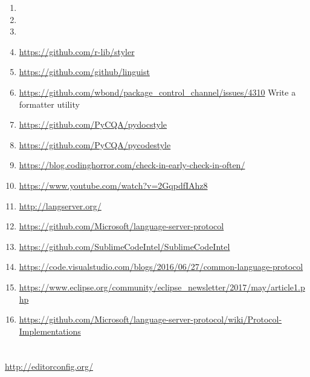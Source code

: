 {\begin{enumerate}
    \item {}
    \item {}
    \item {}
    \item \url{https://github.com/r-lib/styler}
    \item \url{https://github.com/github/linguist}
    \item \url{https://github.com/wbond/package_control_channel/issues/4310} Write a formatter utility
    \item \url{https://github.com/PyCQA/pydocstyle}
    \item \url{https://github.com/PyCQA/pycodestyle}
    \item \url{https://blog.codinghorror.com/check-in-early-check-in-often/}
    \item \url{https://www.youtube.com/watch?v=2GqpdfIAhz8}
    \item \url{http://langserver.org/}
    \item \url{https://github.com/Microsoft/language-server-protocol}
    \item \url{https://github.com/SublimeCodeIntel/SublimeCodeIntel}
    \item \url{https://code.visualstudio.com/blogs/2016/06/27/common-language-protocol}
    \item \url{https://www.eclipse.org/community/eclipse_newsletter/2017/may/article1.php}
    \item \url{https://github.com/Microsoft/language-server-protocol/wiki/Protocol-Implementations}
\end{enumerate}
}



\section{}

\url{http://editorconfig.org/}
\cite{prettyPrintingOfVisualSentences}
\cite{anAbstractPrettyPrinter}
\cite{improvingRefactoringSpeed}

